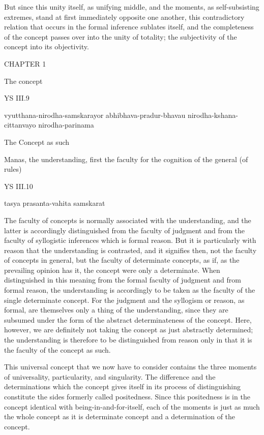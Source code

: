 But since this unity itself, as unifying middle,
and the moments, as self-subsisting extremes,
stand at first immediately opposite one another,
this contradictory relation that occurs
in the formal inference sublates itself,
and the completeness of the concept passes over
into the unity of totality;
the subjectivity of the concept
into its objectivity.

CHAPTER 1

The concept

YS III.9

    vyutthana-nirodha-samskarayor abhibhava-pradur-bhavau
    nirodha-kshana-cittanvayo nirodha-parinama

    The Concept as such

    Manas, the understanding, first the faculty
    for the cognition of the general (of rules)

YS III.10

    tasya prasanta-vahita samskarat

The faculty of concepts is normally
associated with the understanding,
and the latter is accordingly distinguished
from the faculty of judgment
and from the faculty of syllogistic inferences
which is formal reason.
But it is particularly with reason
that the understanding is contrasted,
and it signifies then, not the faculty of concepts in general,
but the faculty of determinate concepts,
as if, as the prevailing opinion has it,
the concept were only a determinate.
When distinguished in this meaning
from the formal faculty of judgment and from formal reason,
the understanding is accordingly to be taken
as the faculty of the single determinate concept.
For the judgment and the syllogism or reason, as formal,
are themselves only a thing of the understanding,
since they are subsumed under the form
of the abstract determinateness of the concept.
Here, however, we are definitely not taking
the concept as just abstractly determined;
the understanding is therefore
to be distinguished from reason only
in that it is the faculty of the concept as such.

This universal concept that we now have to consider
contains the three moments of
universality, particularity, and singularity.
The difference and the determinations which the concept
gives itself in its process of distinguishing constitute
the sides formerly called positedness.
Since this positedness is in the concept
identical with being-in-and-for-itself,
each of the moments is just as much
the whole concept as it is determinate concept
and a determination of the concept.

